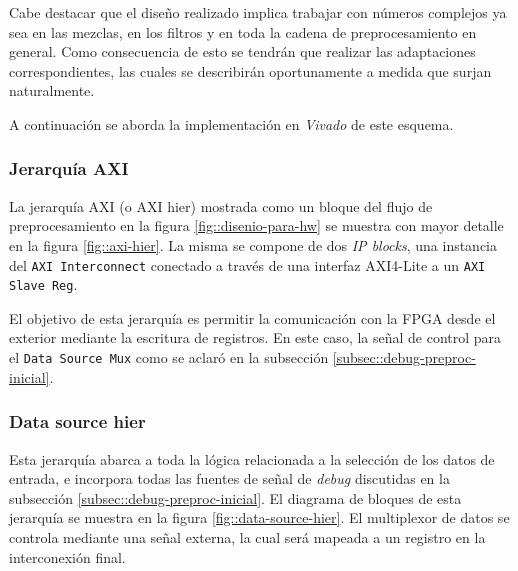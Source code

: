 \documentclass[../../main.tex]{subfiles}
\begin{document}
Cabe destacar que el diseño realizado implica trabajar con números complejos ya sea en las mezclas, en los filtros y en toda la cadena de preprocesamiento en general. Como consecuencia de esto se tendrán que realizar las adaptaciones correspondientes, las cuales se describirán oportunamente a medida que surjan naturalmente.

A continuación se aborda la implementación en \textit{Vivado} de este esquema.

\subsubsection{Jerarquía AXI}
La jerarquía AXI (o AXI hier) mostrada como un bloque del flujo de preprocesamiento en la figura \ref{fig::disenio-para-hw} se muestra con mayor detalle en la figura \ref{fig::axi-hier}. La misma se compone de dos \textit{IP blocks}, una instancia del \texttt{AXI Interconnect} conectado a través de una interfaz AXI4-Lite a un \texttt{AXI Slave Reg}. 

El objetivo de esta jerarquía es permitir la comunicación con la FPGA desde el exterior mediante la escritura de registros. En este caso, la señal de control para el \texttt{Data Source Mux} como se aclaró en la subsección \ref{subsec::debug-preproc-inicial}.



\subsubsection{Data source hier}
Esta jerarquía abarca a toda la lógica relacionada a la selección de los datos de entrada, e incorpora todas las fuentes de señal de \textit{debug} discutidas en la subsección \ref{subsec::debug-preproc-inicial}. El diagrama de bloques de esta jerarquía se muestra en la figura \ref{fig::data-source-hier}. El multiplexor de datos se controla mediante una señal externa, la cual será mapeada a un registro en la interconexión final.
\end{document}
